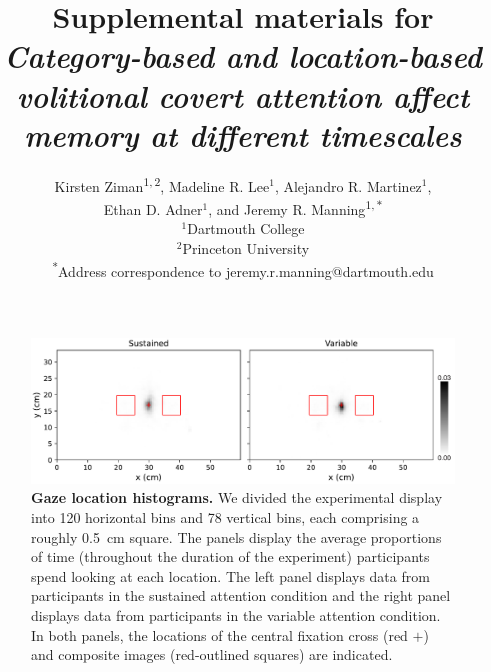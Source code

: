 \documentclass{article}
\begin{document}
\title{Supplemental materials for \textit{Category-based and location-based volitional covert attention affect
memory at different timescales}}

\author{Kirsten Ziman\textsuperscript{$1, 2$},
Madeline R. Lee$^1$,
Alejandro R. Martinez$^1$,\\
Ethan D. Adner$^1$,
and
Jeremy R. Manning\textsuperscript{$1, *$}\\[0.1in]$^1$Dartmouth College\\
$^2$Princeton University\\
\textsuperscript{*}Address correspondence to jeremy.r.manning@dartmouth.edu}


\maketitle


\renewcommand{\thefigure}{S\arabic{figure}}


  \begin{figure}[tp]
	\centering
	\includegraphics[width=1\textwidth]{figs/gaze_locations}
  
 \caption{\textbf{Gaze location histograms.} We divided the experimental
 display into 120 horizontal bins and 78 vertical bins, each comprising a
 roughly 0.5~cm square. The panels display the average proportions of time
 (throughout the duration of the experiment) participants spend looking at each
 location. The left panel displays data from participants in the sustained
 attention condition and the right panel displays data from participants in the
 variable attention condition. In both panels, the locations of the central
 fixation cross (red $+$) and composite images (red-outlined squares) are
 indicated.}
  
  \label{fig:gaze-histograms}
  \end{figure}
\end{document}
